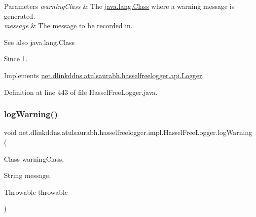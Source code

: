 \begin{DoxyParams}{Parameters}
{\em warning\+Class} & The \mbox{\hyperlink{}{java.\+lang.\+Class}} where a warning message is generated. \\
\hline
{\em message} & The message to be recorded in. \\
\hline
\end{DoxyParams}
\begin{DoxySeeAlso}{See also}
java.\+lang.\+Class 
\end{DoxySeeAlso}
\begin{DoxySince}{Since}
1. 
\end{DoxySince}


Implements \mbox{\hyperlink{interfacenet_1_1dlinkddns_1_1atulsaurabh_1_1hasselfreelogger_1_1api_1_1_logger_a2db4a8f0188cecd4ba6780b31136ded8}{net.\+dlinkddns.\+atulsaurabh.\+hasselfreelogger.\+api.\+Logger}}.



Definition at line 443 of file Hassel\+Free\+Logger.\+java.

\mbox{\label{classnet_1_1dlinkddns_1_1atulsaurabh_1_1hasselfreelogger_1_1impl_1_1_hassel_free_logger_ac5e36ee2095f1f92c90885360a0fd1f1}} 
\subsubsection{\texorpdfstring{log\+Warning()}{logWarning()}\hspace{0.1cm}{\footnotesize\ttfamily [3/3]}}
{\footnotesize\ttfamily void net.\+dlinkddns.\+atulsaurabh.\+hasselfreelogger.\+impl.\+Hassel\+Free\+Logger.\+log\+Warning (\begin{DoxyParamCaption}\item[{Class}]{warning\+Class,  }\item[{String}]{message,  }\item[{Throwable}]{throwable }\end{DoxyParamCaption})}


